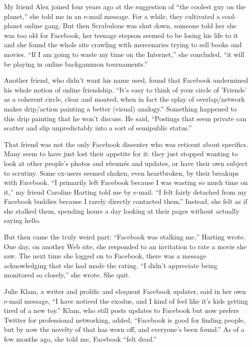 ﻿\documentclass[12pt]{article}
\begin{document}
My friend Alex joined four years ago at the suggestion of ``the coolest guy on the planet,'' she
told me in an e-mail message. For a while, they cultivated a cool-planet online gang. But then
Scrabulous was shut down, someone told her she was too old for Facebook, her teenage stepson seemed
to be losing his life to it and she found the whole site crawling with mercenaries trying to sell
books and movies. ``If I am going to waste my time on the Internet,'' she concluded, ``it will be
playing in online backgammon tournaments.''

Another friend, who didn't want his name used, found that Facebook undermined his whole notion of
online friendship. ``It's easy to think of your circle of 'Friends' as a coherent circle, clear and
moated, when in fact the splay of overlap/network makes drip/action painting a better (visual)
analogy.'' Something happened to this drip painting that he won't discuss. He said, ``Postings that
seem private can scatter and slip unpredictably into a sort of semipublic status.''

That friend was not the only Facebook dissenter who was reticent about specifics. Many seem to have
just lost their appetite for it: they just stopped wanting to look at other people's photos and
r\'esum\'es and updates, or have their own subject to scrutiny. Some ex-users seemed shaken, even
heartbroken, by their breakups with Facebook. ``I primarily left Facebook because I was wasting so
much time on it,'' my friend Caroline Harting told me by e-mail. ``I felt fairly detached from my
Facebook buddies because I rarely directly contacted them.'' Instead, she felt as if she stalked
them, spending hours a day looking at their pages without actually saying hello.

But then came the truly weird part: ``Facebook was stalking me,'' Harting wrote. One day, on another
Web site, she responded to an invitation to rate a movie she saw. The next time she logged on to
Facebook, there was a message acknowledging that she had made the rating. ``I didn't appreciate
being monitored so closely,'' she wrote. She quit.

Julie Klam, a writer and prolific and eloquent Facebook updater, said in her own e-mail message, ``I
have noticed the exodus, and I kind of feel like it's kids getting tired of a new toy.'' Klam, who
still posts updates to Facebook but now prefers Twitter for professional networking, added,
``Facebook is good for finding people, but by now the novelty of that has worn off, and everyone's
been found.'' As of a few months ago, she told me, Facebook ``felt dead.''
\end{document}
